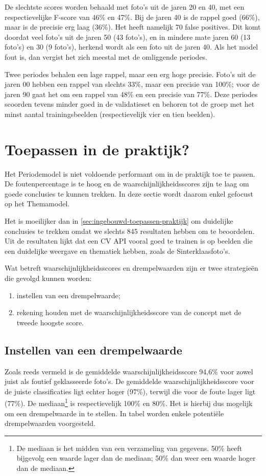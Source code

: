 De slechtste scores worden behaald met foto’s uit de jaren 20 en 40, met een respectievelijke F-score van 46\% en 47\%. Bij de jaren 40 is de rappel goed (66\%), maar is de precisie erg laag (36\%). Het heeft namelijk 70 false positives. Dit komt doordat veel foto’s uit de jaren 50 (43 foto’s), en in mindere mate jaren 60 (13 foto’s) en 30 (9 foto’s), herkend wordt als een foto uit de jaren 40. Als het model fout is, dan vergist het zich meestal met de omliggende periodes.

Twee periodes behalen een lage rappel, maar een erg hoge precisie. Foto’s uit de jaren 00 hebben een rappel van slechts 33\%, maar een precisie van 100\%; voor de jaren 90 gaat het om een rappel van 48\% en een precisie van 77\%. Deze periodes scoorden tevens minder goed in de validatieset en behoren tot de groep met het minst aantal trainingsbeelden (respectievelijk vier en tien beelden). 

\section{Toepassen in de praktijk?}
\label{sec:custom-toepassen-praktijk}
Het Periodemodel is niet voldoende performant om in de praktijk toe te passen. De foutenpercentage is te hoog en de waarschijnlijkheidsscores zijn te laag om goede conclusies te kunnen trekken. In deze sectie wordt daarom enkel gefocust op het Themamodel.

Het is moeilijker dan in \ref{sec:ingebouwd-toepassen-praktijk} om duidelijke conclusies te trekken omdat we slechts 845 resultaten hebben om te beoordelen. Uit de resultaten lijkt dat een CV API vooral goed te trainen is op beelden die een duidelijke weergave en thematiek hebben, zoals de Sinterklaasfoto’s.

Wat betreft waarschijnlijkheidsscores en drempelwaarden zijn er twee strategieën die gevolgd kunnen worden: 
\begin{enumerate}
        \item instellen van een drempelwaarde;
        \item rekening houden met de waarschijnlijkheidsscore van de concept met de tweede hoogste score.
\end{enumerate}

\subsection{Instellen van een drempelwaarde}
Zoals reeds vermeld is de gemiddelde waarschijnlijkheidsscore 94,6\% voor zowel juist als foutief geklasseerde foto’s. De gemiddelde waarschijnlijkheidsscore voor de juiste classificaties ligt echter hoger (97\%), terwijl die voor de foute lager ligt (77\%). De mediaan\footnote{De mediaan is het midden van een verzameling van gegevens. 50\% heeft bijgevolg een waarde lager dan de mediaan; 50\% dan weer een waarde hoger dan de mediaan.} is respectievelijk 100\% en 80\%. Het is hierbij dus mogelijk om een drempelwaarde in te stellen. In tabel worden enkele potentiële drempelwaarden voorgesteld.  

